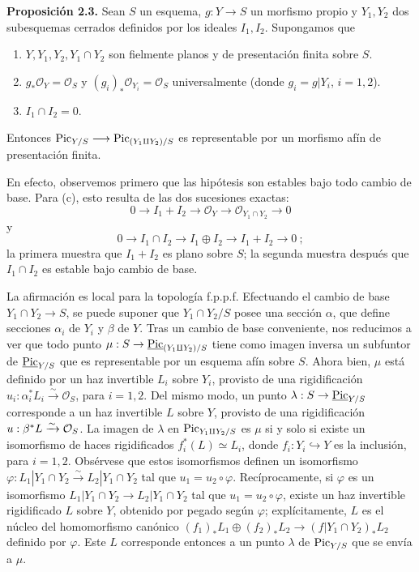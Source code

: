 \textbf{Proposición 2.3.} Sean \(S\) un esquema, \(g:Y\to S\) un morfismo
propio y \(Y_1,Y_2\) dos subesquemas cerrados definidos por los ideales
\(I_1,I_2\). Supongamos que
\begin{enumerate}[label=\alph*)]
\item \(Y,Y_1,Y_2,Y_1\cap Y_2\) son fielmente planos y de presentación
finita sobre \(S\).
\item \(g_*\mathcal O_Y=\mathcal O_S\) y
\((g_i)_*\mathcal O_{Y_i}=\mathcal O_S\) universalmente (donde
\(g_i=g|Y_i\), \(i=1,2\)).
\item \(I_1\cap I_2=0\).
\end{enumerate}
Entonces \(\operatorname{Pic}_{Y/S}\longrightarrow \operatorname{Pic}_{(Y_1\amalg Y_2)/S}\) es
representable por un morfismo afín de presentación finita.

En efecto, observemos primero que las hipótesis son estables bajo todo cambio
de base. Para (c), esto resulta de las dos sucesiones exactas:
\[
  0\longrightarrow I_1+I_2\longrightarrow\mathcal O_Y
  \longrightarrow\mathcal O_{Y_1\cap Y_2}\longrightarrow0
\]
y
\[
  0\longrightarrow I_1\cap I_2\longrightarrow I_1\oplus I_2
  \longrightarrow I_1+I_2\longrightarrow0~;
\]
la primera muestra que \(I_1+I_2\) es plano sobre \(S\); la segunda muestra
después que \(I_1\cap I_2\) es estable bajo cambio de base.

La afirmación es local para la topología f.p.p.f. Efectuando el cambio de
base \(Y_1\cap Y_2\to S\), se puede suponer que \(Y_1\cap Y_2/S\) posee una
sección \(\alpha\), que define secciones \(\alpha_i\) de \(Y_i\) y \(\beta\)
de \(Y\). Tras un cambio de base conveniente, nos reducimos a ver que todo
punto \(\mu:S\to\underline{\operatorname{Pic}}_{(Y_1\amalg Y_2)/S}\) tiene como imagen inversa un
subfuntor de \(\underline{\operatorname{Pic}}_{Y/S}\) que es representable por un esquema afín sobre
\(S\). Ahora bien, \(\mu\) está definido por un haz invertible \(L_i\) sobre
\(Y_i\), provisto de una rigidificación
\(u_i:\alpha_i^*L_i\xrightarrow{\sim}\mathcal O_S\), para \(i=1,2\). Del
mismo modo, un punto \(\lambda:S\to\underline{\operatorname{Pic}}_{Y/S}\) corresponde a un haz
invertible \(L\) sobre \(Y\), provisto de una rigidificación
\(u:\beta^*L\xrightarrow{\sim}\mathcal O_S\). La imagen de \(\lambda\) en %
\(\operatorname{Pic}_{Y_1\amalg Y_2/S}\) es \(\mu\) si y solo si existe un isomorfismo de
haces rigidificados \(f_i^*(L)\simeq L_i\), donde
\(f_i:Y_i\hookrightarrow Y\) es la inclusión, para \(i=1,2\). Obsérvese que
estos isomorfismos definen un isomorfismo
\(\varphi:L_1|Y_1\cap Y_2\xrightarrow{\sim}L_2|Y_1\cap Y_2\) tal que
\(u_1=u_2\circ\varphi\). Recíprocamente, si \(\varphi\) es un isomorfismo
\(L_1|Y_1\cap Y_2\to L_2|Y_1\cap Y_2\) tal que
\(u_1=u_2\circ\varphi\), existe un haz invertible rigidificado \(L\) sobre
\(Y\), obtenido por pegado según \(\varphi\); explícitamente, \(L\) es el
núcleo del homomorfismo canónico
\((f_1)_*L_1\oplus(f_2)_*L_2\longrightarrow(f|Y_1\cap Y_2)_*L_2\) definido
por \(\varphi\). Este \(L\) corresponde entonces a un punto \(\lambda\) de
\(\operatorname{Pic}_{Y/S}\) que se envía a \(\mu\).

